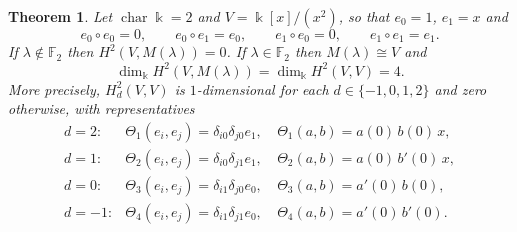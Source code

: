 \documentclass[11pt,reqno]{amsart}
\theoremstyle{plain}
\newtheorem{theorem}{Theorem}[section]
\theoremstyle{definition}
\newcommand{\kk}{\Bbbk}
\newcommand{\Ht}{H^2}
\begin{document}
\begin{theorem}\label{thm:p2}
Let $\operatorname{char}\kk=2$ and $V=\kk[x]/(x^2)$, so that $e_0=1$, $e_1=x$ and
\[
e_0\circ e_0=0,\qquad e_0\circ e_1=e_0,\qquad e_1\circ e_0=0,\qquad e_1\circ e_1=e_1 .
\]
If $\lambda\notin\mathbb{F}_2$ then $\Ht(V,M(\lambda))=0$. If $\lambda\in\mathbb{F}_2$ then
$M(\lambda)\cong V$ and
\[
\dim_\kk\Ht(V,M(\lambda))=\dim_\kk\Ht(V,V)=4 .
\]
More precisely, $\Ht_d(V,V)$ is $1$-dimensional for each $d\in\{-1,0,1,2\}$ and zero
otherwise, with representatives
\[
\begin{array}{lll}
d=2: &\Theta_1(e_i,e_j)=\delta_{i0}\delta_{j0}e_1, &\ \Theta_1(a,b)=a(0)\,b(0)\,x,\\[2pt]
d=1: &\Theta_2(e_i,e_j)=\delta_{i0}\delta_{j1}e_1, &\ \Theta_2(a,b)=a(0)\,b'(0)\,x,\\[2pt]
d=0: &\Theta_3(e_i,e_j)=\delta_{i1}\delta_{j0}e_0, &\ \Theta_3(a,b)=a'(0)\,b(0),\\[2pt]
d=-1:&\Theta_4(e_i,e_j)=\delta_{i1}\delta_{j1}e_0, &\ \Theta_4(a,b)=a'(0)\,b'(0).
\end{array}
\]
\end{theorem}
\end{document}
